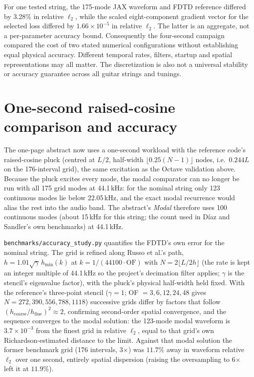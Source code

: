 \documentclass[a4paper,10pt]{article}
\begin{document}
For one tested string, the 175-mode JAX waveform and FDTD reference differed by 3.28\% in relative $\ell_2$, while the scaled eight-component gradient vector for the selected loss differed by $1.66\times10^{-5}$ in relative $\ell_2$. The latter is an aggregate, not a per-parameter accuracy bound. Consequently the four-second campaign compared the cost of two stated numerical configurations without establishing equal physical accuracy. Different temporal rates, filters, startup and spatial representations may all matter. The discretization is also not a universal stability or accuracy guarantee across all guitar strings and tunings.

\section{One-second raised-cosine comparison and accuracy}
The one-page abstract now uses a one-second workload with the reference code's raised-cosine pluck (centred at $L/2$, half-width $\lfloor 0.25(N-1)\rfloor$ nodes, i.e.\ $0.244L$ on the 176-interval grid), the same excitation as the Octave validation above. Because the pluck excites every mode, the modal comparator can no longer be run with all 175 grid modes at 44.1\,kHz: for the nominal string only 123 continuous modes lie below 22.05\,kHz, and the exact modal recurrence would alias the rest into the audio band. The abstract's \emph{Modal} therefore uses 100 continuous modes (about 15\,kHz for this string; the count used in Díaz and Sandler's own benchmarks) at 44.1\,kHz.

\texttt{benchmarks/accuracy\_study.py} quantifies the FDTD's own error for the nominal string. The grid is refined along Russo et al.'s path, $h=1.01\sqrt{\gamma}\,h_{\min}(k)$ at $k=1/(44100\cdot\mathrm{OF})$ with $N=2\lfloor L/2h\rfloor$ (the rate is kept an integer multiple of 44.1\,kHz so the project's decimation filter applies; $\gamma$ is the stencil's eigenvalue factor), with the pluck's physical half-width held fixed. With the reference's three-point stencil ($\gamma=1$; OF $=3,6,12,24,48$ gives $N=272,390,556,788,1118$) successive grids differ by factors that follow $(h_{\mathrm{coarse}}/h_{\mathrm{fine}})^2\approx2$, confirming second-order spatial convergence, and the sequence converges to the modal solution: the 123-mode modal waveform is $3.7\times10^{-3}$ from the finest grid in relative $\ell_2$, equal to that grid's own Richardson-estimated distance to the limit. Against that modal solution the former benchmark grid (176 intervals, 3$\times$) was $11.7\%$ away in waveform relative $\ell_2$ over one second, entirely spatial dispersion (raising the oversampling to 6$\times$ left it at $11.9\%$).
\end{document}

